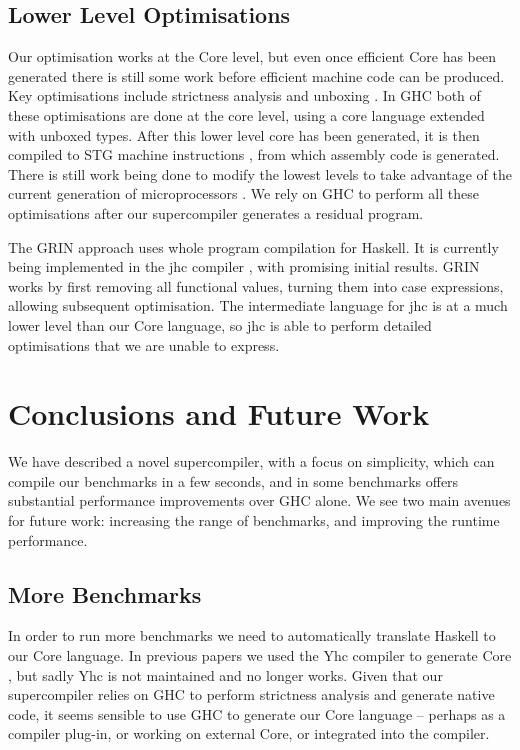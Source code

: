 \documentclass[draft]{sigplanconf}
\begin{document}
\subsection{Lower Level Optimisations}

Our optimisation works at the Core level, but even once efficient Core has been generated there is still some work before efficient machine code can be produced. Key optimisations include strictness analysis and unboxing \cite{spj:unboxing}. In GHC both of these optimisations are done at the core level, using a core language extended with unboxed types. After this lower level core has been generated, it is then compiled to STG machine instructions \cite{spj:stg}, from which assembly code is generated. There is still work being done to modify the lowest levels to take advantage of the current generation of microprocessors \cite{marlow:pointer_tagging}. We rely on GHC to perform all these optimisations after our supercompiler generates a residual program.

The GRIN approach \cite{grin} uses whole program compilation for Haskell. It is currently being implemented in the jhc compiler \cite{jhc}, with promising initial results. GRIN works by first removing all functional values, turning them into case expressions, allowing subsequent optimisation. The intermediate language for jhc is at a much lower level than our Core language, so jhc is able to perform detailed optimisations that we are unable to express.

\section{Conclusions and Future Work}

We have described a novel supercompiler, with a focus on simplicity, which can compile our benchmarks in a few seconds, and in some benchmarks offers substantial performance improvements over GHC alone. We see two main avenues for future work: increasing the range of benchmarks, and improving the runtime performance.

\subsection{More Benchmarks}

In order to run more benchmarks we need to automatically translate Haskell to our Core language. In previous papers we used the Yhc compiler to generate Core \cite{me:yhc_core}, but sadly Yhc is not maintained and no longer works. Given that our supercompiler relies on GHC to perform strictness analysis and generate native code, it seems sensible to use GHC to generate our Core language -- perhaps as a compiler plug-in, or working on external Core, or integrated into the compiler.
\end{document}
